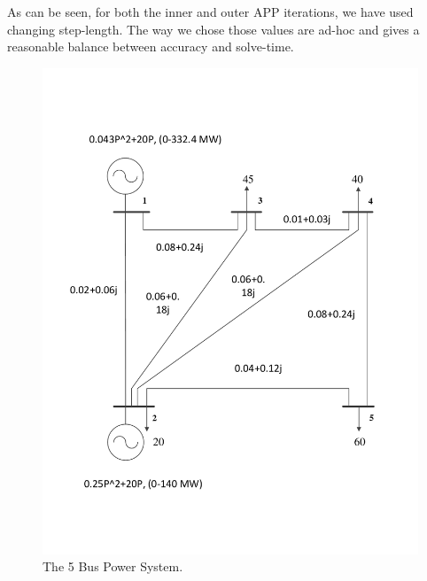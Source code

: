 \documentclass[preprint,12pt,3p]{elsarticle}
\begin{document}
	As can be seen, for both the inner and outer APP iterations, we have used changing step-length. The way we chose those values are ad-hoc and gives a reasonable balance between accuracy and solve-time.
	\iffalse
	\begin{figure}
		\begin{center}
			\includegraphics[width=0.92\linewidth,trim=5mm 12mm 5mm 5mm, clip]{5_bus}
			\caption{The 5 Bus Power System.}
			\label{fig:5Bus}
		\end{center}
	\end{figure}
\end{document}
